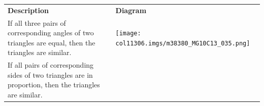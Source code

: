 \begin{table}[H]
\begin{center}
\begin{xtabular*}{\mytablewidth}[t]{|p{10\mystarwidth}|p{10\mystarwidth}|}
                    \textbf{Description}
                   &
    
    
        
                    \textbf{Diagram}
     \tabularnewline{}
    
    
        If all three pairs of corresponding angles of two triangles are equal, then the triangles are similar. &
    
    
        
                    
    \setcounter{subfigure}{0}

\label{m38380*id318251}
    \begin{center}
    \label{m38380*id318251!!!underscore!!!media}\label{m38380*id318251!!!underscore!!!printimage}\texttt{[image: col11306.imgs/m38380\_MG10C13\_035.png]} %
        
      \vspace{2pt}
    \vspace{.1in}
    
    \end{center}



    \addtocounter{footnote}{-0}
    
     \tabularnewline{}
    
    
        If all pairs of corresponding sides of two triangles are in proportion, then the triangles are similar. &
    

\end{xtabular*}
\end{center}
\end{table}
